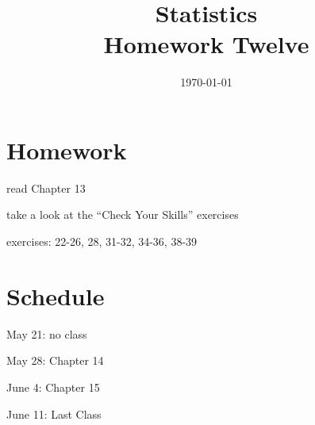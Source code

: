 \documentclass[letterpaper]{exam}
\title{Statistics \\ Homework Twelve}
\date{\today}
\author{}
\begin{document}
  \maketitle

  \section{Homework}
  \ifprintanswers
  \else
    \begin{itemize*}
      \item read Chapter 13 
      \item take a look at the ``Check Your Skills'' exercises
      \item exercises: 22-26, 28, 31-32, 34-36, 38-39
    \end{itemize*}
  \fi

  \section{Schedule}
  \begin{itemize*}
    \item May 21: no class
    \item May 28: Chapter 14
    \item June 4: Chapter 15
    \item June 11: Last Class
  \end{itemize*}

  \ifprintanswers
\end{document}
